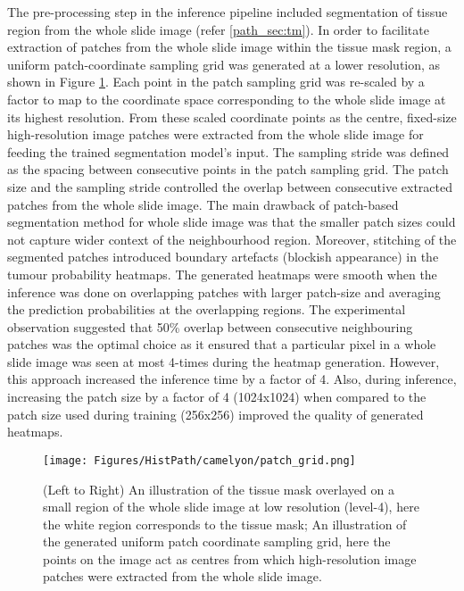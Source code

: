 \documentclass[times,twocolumn,final,authoryear]{tmp}
\begin{document}
The pre-processing step in the inference pipeline included segmentation of tissue region from the whole slide image (refer \ref{path_sec:tm}).  In order to facilitate extraction of patches from the whole slide image within the tissue mask region, a uniform patch-coordinate sampling grid was generated at a lower resolution, as shown in Figure \ref{path_fig:patch_grid}. Each point in the patch sampling grid was re-scaled by a factor to map to the coordinate space corresponding to the whole slide image at its highest resolution. From these scaled coordinate points as the centre, fixed-size high-resolution image patches were extracted from the whole slide image for feeding the trained segmentation model's input. The sampling stride was defined as the spacing between consecutive points in the patch sampling grid. The patch size and the sampling stride controlled the overlap between consecutive extracted patches from the whole slide image. The main drawback of patch-based segmentation method for whole slide image was that the smaller patch sizes could not capture wider context of the neighbourhood region. Moreover, stitching of the segmented patches introduced boundary artefacts (blockish appearance) in the tumour probability heatmaps. The generated heatmaps were smooth when the inference was done on overlapping patches with larger patch-size and averaging the prediction probabilities at the overlapping regions. The experimental observation suggested that 50\% overlap between consecutive neighbouring patches was the optimal choice as it ensured that a particular pixel in a whole slide image was seen at most 4-times during the heatmap generation. However, this approach increased the inference time by a factor of 4. Also, during inference, increasing the patch size by a factor of 4 (1024x1024) when compared to the patch size used during training (256x256) improved the quality of generated heatmaps. 


\begin{figure}
\texttt{[image: Figures/HistPath/camelyon/patch\_grid.png]}
    \caption{(Left to Right) An illustration of the tissue mask overlayed on a small region of the whole slide image at low resolution (level-4), here the white region corresponds to the tissue mask; An illustration of the generated uniform patch coordinate sampling grid, here the points on the image act as centres from which high-resolution image patches were extracted from the whole slide image.}
    \label{path_fig:patch_grid}
\end{figure}
\end{document}
